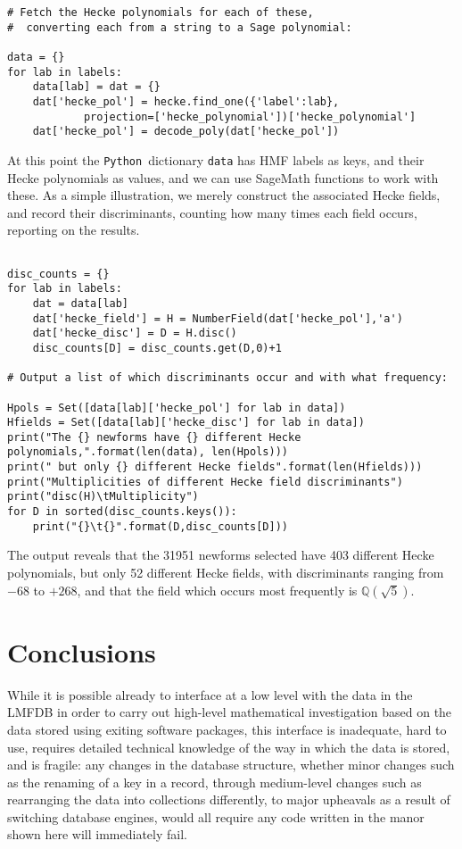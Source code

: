 \documentclass{llncs}
\def\Q{{\mathbb Q}}
\def\Python{{\tt Python}}
\begin{document}
\begin{verbatim}
# Fetch the Hecke polynomials for each of these,
#  converting each from a string to a Sage polynomial:

data = {}
for lab in labels:
    data[lab] = dat = {}
    dat['hecke_pol'] = hecke.find_one({'label':lab},
            projection=['hecke_polynomial'])['hecke_polynomial']
    dat['hecke_pol'] = decode_poly(dat['hecke_pol'])

\end{verbatim}
At this point the \Python\ dictionary {\tt data} has HMF labels as
keys, and their Hecke polynomials as values, and we can use SageMath
functions to work with these.  As a simple illustration, we merely
construct the associated Hecke fields, and record their discriminants,
counting how many times each field occurs, reporting on the results.
\begin{verbatim}

disc_counts = {}
for lab in labels:
    dat = data[lab]
    dat['hecke_field'] = H = NumberField(dat['hecke_pol'],'a')
    dat['hecke_disc'] = D = H.disc()
    disc_counts[D] = disc_counts.get(D,0)+1

# Output a list of which discriminants occur and with what frequency:

Hpols = Set([data[lab]['hecke_pol'] for lab in data])
Hfields = Set([data[lab]['hecke_disc'] for lab in data])
print("The {} newforms have {} different Hecke polynomials,".format(len(data), len(Hpols)))
print(" but only {} different Hecke fields".format(len(Hfields)))
print("Multiplicities of different Hecke field discriminants")
print("disc(H)\tMultiplicity")
for D in sorted(disc_counts.keys()):
    print("{}\t{}".format(D,disc_counts[D]))

\end{verbatim}

The output reveals that the 31951 newforms selected have 403 different
Hecke polynomials, but only 52 different Hecke fields, with
discriminants ranging from $-68$ to $+268$, and that the field which
occurs most frequently is $\Q(\sqrt{5})$.

\section{Conclusions}
While it is possible already to interface at a low level with the data
in the LMFDB in order to carry out high-level mathematical
investigation based on the data stored using exiting software
packages, this interface is inadequate, hard to use, requires detailed
technical knowledge of the way in which the data is stored, and is
fragile: any changes in the database structure, whether minor changes
such as the renaming of a key in a record, through medium-level
changes such as rearranging the data into collections differently, to
major upheavals as a result of switching database engines, would all
require any code written in the manor shown here will immediately
fail.
\end{document}
